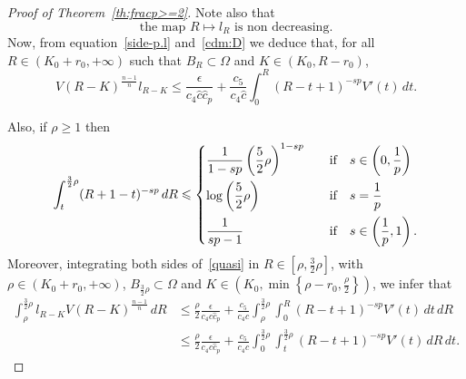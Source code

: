 \documentclass[12pt]{article}
\numberwithin{equation}{section}
\renewcommand{\leq}{\leqslant}
\renewcommand{\geq}{\geqslant}
\begin{document}
\begin{proof}[Proof of Theorem~\ref{th:fracp>=2}]
Note also that 
\begin{equation}\label{rfdvchytgbffff} \mbox{the map }
R\longmapsto l_R\mbox{  is non decreasing}.
\end{equation}
Now, from equation~\eqref{side-p.l} and~\eqref{cdm:D} we deduce that, for all~$R\in \left(K_0+r_0,+\infty\right)$ such that $B_R\subset\Omega$ and $K\in (K_0,R-r_0)$, 
\begin{equation}\label{quasi}
V(R-K)^{\frac{n-1}{n}}l_{R-K}\leq \frac{\epsilon}{c_4\hat{c}\hat{c}_p}+\frac{c_5}{c_4\hat{c}}\int_{0}^R(R-t+1)^{-sp}V'(t)\,dt.
\end{equation}

Also, if $\rho\geq 1$ then 
\begin{equation}\label{pvdcbgrfeee4}
\int_{t}^{\frac{3}{2}\rho} (R+1-t)^{-sp}\,dR\leq \begin{dcases}
\frac{1}{1-sp}\left(\frac{5}{2}\rho\right)^{1-sp}\quad &\mbox{if}\quad s\in \left(0,\frac{1}{p}\right)\\
\log\left(\frac{5}{2}\rho\right)\quad &\mbox{if}\quad s=\frac{1}{p}\\
\frac{1}{sp-1}\quad &\mbox{if}\quad s\in \left(\frac{1}{p},1\right).
\end{dcases}
\end{equation} 
Moreover, integrating both sides of~\eqref{quasi} in $R\in \left[\rho,\frac{3}{2}\rho\right]$, with $\rho\in \left(K_0+r_0,+\infty\right)$, $B_{\frac{3}{2}\rho}\subset\Omega$ and $K\in \left(K_0, \min\left\lbrace \rho-r_0,\frac{\rho}{2}\right\rbrace\right)$, we infer that 
\begin{equation}\label{mbfvgtrrrrf}
\begin{split}
\int_{\rho}^{\frac{3}{2}\rho} l_{R-K}V(R-K)^{\frac{n-1}{n}}\,dR &\leq \frac{\rho}{2}\frac{\epsilon}{c_4\hat{c}\hat{c}_p}+\frac{c_5}{c_4\hat{c}}\int_{\rho}^{\frac{3}{2}\rho}\int_{0}^R \left(R-t+1\right)^{-sp}V'(t)\,dt\,dR\\
& \leq  \frac{\rho}{2}\frac{\epsilon}{c_4\hat{c}\hat{c}_p}+\frac{c_5}{c_4\hat{c}}\int_{0}^{\frac{3}{2}\rho}\int_{t}^{\frac{3}{2}\rho} \left(R-t+1\right)^{-sp}V'(t)\,dR\,dt.
\end{split}
\end{equation}


\end{proof}
\end{document}
